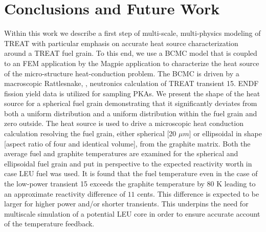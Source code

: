 \documentclass{anstrans}
\begin{document}
\section{Conclusions and Future Work}
Within this work we describe a first step of multi-scale, multi-physics modeling of TREAT with particular emphasis on accurate heat source characterization around a TREAT fuel grain. To this end, we use a BCMC model that is coupled to an FEM application by the Magpie application to characterize the heat source of the micro-structure heat-conduction problem. The BCMC is driven by a macroscopic Rattlesnake, \cite{Rattlesnake}, neutronics calculation of TREAT transient 15. ENDF fission yield data is utilized for sampling PKAs. We present the shape of the heat source for a spherical fuel grain demonstrating that it significantly deviates from both a uniform distribution and a uniform distribution within the fuel grain and zero outside. The heat source is used to drive a microscopic heat conduction calculation resolving the fuel grain, either spherical [20 $\mu m$] or ellipsoidal in shape [aspect ratio of four and identical volume], from the graphite matrix. Both the average fuel and graphite temperatures are examined for the spherical and ellipsoidal fuel grain and put in perspective to the expected reactivity worth in case LEU fuel was used. It is found that the fuel temperature even in the case of the low-power transient 15 exceeds the graphite temperature by 80 K leading to an approximate reactivity difference of $11$ cents. This difference is expected to be larger for higher power and/or shorter transients. This underpins the need for multiscale simulation of a potential LEU core in order to ensure accurate account of the temperature feedback.
\end{document}
